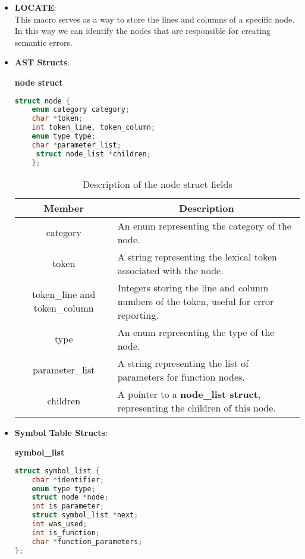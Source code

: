\documentclass[12pt]{article}
\begin{document}
\begin{itemize}
    
    \item \textbf{LOCATE}: \\ This macro serves as a way to store the lines and columns of a specific node. In this way we can identify the nodes that are responsible for creating semantic errors.
    \item \textbf{AST Structs}: \\
    \begin{center}
        \textbf{node struct}
    \end{center}
        \begin{center}
            \begin{lstlisting}[language=C, basicstyle=\small\ttfamily]
struct node {
    enum category category;  
    char *token;
    int token_line, token_column; 
    enum type type;
    char *parameter_list;
     struct node_list *children;
    };
        \end{lstlisting}
    \end{center}
        \begin{table}[h!]
            \centering
            \begin{tabular}{|c|p{10cm}|}
            \hline
            Member & \multicolumn{1}{|c|}{Description} \\
            \hline
            category & An enum representing the category of the node. \\
            \hline
            token & A string representing the lexical token associated with the node. \\
            \hline
            token\_line and token\_column & Integers storing the line and column numbers of the token, useful for error reporting. \\
            \hline
            type & An enum representing the type of the node. \\
            \hline
            parameter\_list & A string representing the list of parameters for function nodes. \\
            \hline
            children & A pointer to a \textbf{node\_list struct}, representing the children of this node. \\
            \hline
            \end{tabular}
            \caption{Description of the node struct fields}
            \label{tab:node_struct}
        \end{table}
    
    \item \textbf{Symbol Table Structs}: \\  
    \begin{center}
        \textbf{symbol\_list}
    \end{center}
    \begin{center}
        \begin{lstlisting}[language=C, basicstyle=\small\ttfamily]
struct symbol_list {
    char *identifier;
    enum type type;
    struct node *node;
    int is_parameter;
    struct symbol_list *next;
    int was_used;
    int is_function;
    char *function_parameters;
};


\end{lstlisting}
\end{center}
\end{itemize}
\end{document}
